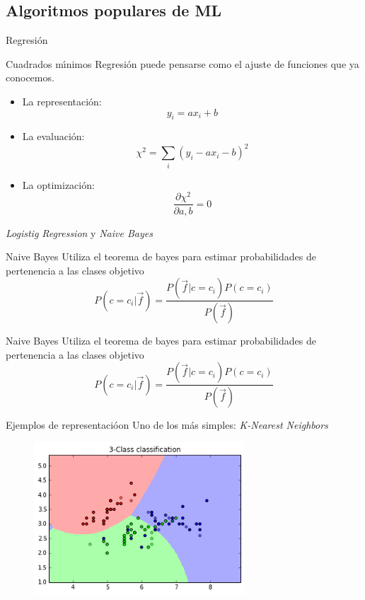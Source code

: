 \documentclass[11pt]{beamer}
\begin{document}
\subsection{Algoritmos populares de ML}
\begin{frame}{Regresi\'on}
    
    \begin{block}{Cuadrados m\'{\i}nimos}
    Regresi\'on puede pensarse como el ajuste de funciones que ya conocemos.
    \end{block}
    
    \begin{itemize}
        \item La representaci\'on: $$y_i = a x_i + b$$
        \item La evaluaci\'on: $$\chi^2 = \sum_i(y_i - a x_i -b)^2$$
        \item La optimizaci\'on: $$\frac{\partial \chi^2}{\partial a,b} = 0$$
   \end{itemize}
\end{frame}
\begin{frame}{\textit{Logistig Regression} y \textit{Naive Bayes}}
    \begin{exampleblock}{Naive Bayes}
    Utiliza el teorema de bayes para estimar probabilidades de pertenencia a las clases objetivo
    $$P(c=c_i|\vec{f}) = \frac{P(\vec{f}|c=c_i)P(c=c_i)}{P(\vec{f})}$$
    \end{exampleblock}
    
    \begin{exampleblock}{Naive Bayes}
    Utiliza el teorema de bayes para estimar probabilidades de pertenencia a las clases objetivo
    $$P(c=c_i|\vec{f}) = \frac{P(\vec{f}|c=c_i)P(c=c_i)}{P(\vec{f})}$$
    \end{exampleblock}
    
\end{frame}
\begin{frame}{Ejemplos de representaci\'oon}
  Uno de los m\'as simples: \textit{K-Nearest Neighbors}
  \begin{figure}
  \centering
  \includegraphics[width=0.7\textwidth]{images/knearest_example.png}
  \label{fig:my_label}
  \end{figure}
\end{frame}
\end{document}
